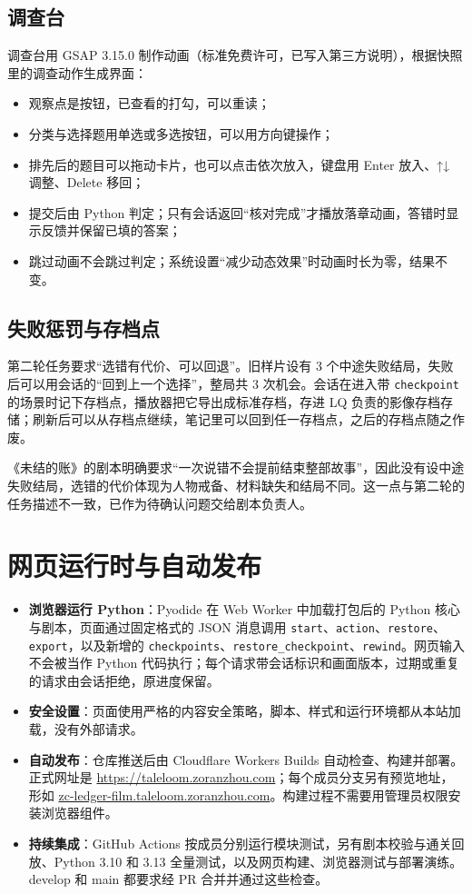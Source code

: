 \documentclass[11pt,a4paper,fontset=mac]{ctexart}
\begin{document}
\subsection{调查台}

调查台用 GSAP 3.15.0 制作动画（标准免费许可，已写入第三方说明），根据快照里的调查动作生成界面：

\begin{itemize}
  \item 观察点是按钮，已查看的打勾，可以重读；
  \item 分类与选择题用单选或多选按钮，可以用方向键操作；
  \item 排先后的题目可以拖动卡片，也可以点击依次放入，键盘用 Enter 放入、↑↓ 调整、Delete 移回；
  \item 提交后由 Python 判定；只有会话返回“核对完成”才播放落章动画，答错时显示反馈并保留已填的答案；
  \item 跳过动画不会跳过判定；系统设置“减少动态效果”时动画时长为零，结果不变。
\end{itemize}

\subsection{失败惩罚与存档点}

第二轮任务要求“选错有代价、可以回退”。旧样片设有 3 个中途失败结局，失败后可以用会话的“回到上一个选择”，整局共 3 次机会。会话在进入带 \texttt{checkpoint} 的场景时记下存档点，播放器把它导出成标准存档，存进 LQ 负责的影像存档存储；刷新后可以从存档点继续，笔记里可以回到任一存档点，之后的存档点随之作废。

《未结的账》的剧本明确要求“一次说错不会提前结束整部故事”，因此没有设中途失败结局，选错的代价体现为人物戒备、材料缺失和结局不同。这一点与第二轮的任务描述不一致，已作为待确认问题交给剧本负责人。

\section{网页运行时与自动发布}

\begin{itemize}
  \item \textbf{浏览器运行 Python}：Pyodide 在 Web Worker 中加载打包后的 Python 核心与剧本，页面通过固定格式的 JSON 消息调用 \texttt{start}、\texttt{action}、\texttt{restore}、\texttt{export}，以及新增的 \texttt{checkpoints}、\texttt{restore\_checkpoint}、\texttt{rewind}。网页输入不会被当作 Python 代码执行；每个请求带会话标识和画面版本，过期或重复的请求由会话拒绝，原进度保留。
  \item \textbf{安全设置}：页面使用严格的内容安全策略，脚本、样式和运行环境都从本站加载，没有外部请求。
  \item \textbf{自动发布}：仓库推送后由 Cloudflare Workers Builds 自动检查、构建并部署。正式网址是 \url{https://taleloom.zoranzhou.com}；每个成员分支另有预览地址，形如 \url{zc-ledger-film.taleloom.zoranzhou.com}。构建过程不需要用管理员权限安装浏览器组件。
  \item \textbf{持续集成}：GitHub Actions 按成员分别运行模块测试，另有剧本校验与通关回放、Python 3.10 和 3.13 全量测试，以及网页构建、浏览器测试与部署演练。develop 和 main 都要求经 PR 合并并通过这些检查。
\end{itemize}
\end{document}
